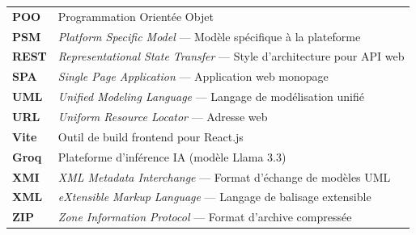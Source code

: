 \begin{tabular}{ll}
\textbf{POO} & Programmation Orientée Objet \\[6pt]
\textbf{PSM} & \textit{Platform Specific Model} — Modèle spécifique à la plateforme \\[6pt]
\textbf{REST} & \textit{Representational State Transfer} — Style d'architecture pour API web \\[6pt]
\textbf{SPA} & \textit{Single Page Application} — Application web monopage \\[6pt]
\textbf{UML} & \textit{Unified Modeling Language} — Langage de modélisation unifié \\[6pt]
\textbf{URL} & \textit{Uniform Resource Locator} — Adresse web \\[6pt]
\textbf{Vite} & Outil de build frontend pour React.js \\[6pt]
\textbf{Groq} & Plateforme d'inférence IA (modèle Llama 3.3) \\[6pt]
\textbf{XMI} & \textit{XML Metadata Interchange} — Format d'échange de modèles UML \\[6pt]
\textbf{XML} & \textit{eXtensible Markup Language} — Langage de balisage extensible \\[6pt]
\textbf{ZIP} & \textit{Zone Information Protocol} — Format d'archive compressée \\[6pt]
\end{tabular}